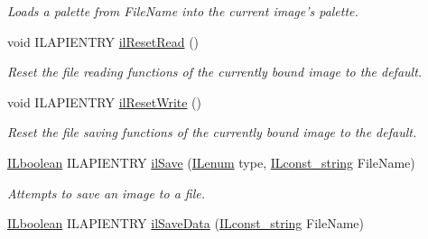 \begin{DoxyCompactItemize}
\begin{DoxyCompactList}\small\item\em Loads a palette from File\+Name into the current image's palette. \end{DoxyCompactList}\item 
\hypertarget{group__file_gaad6da45dcc526f0b4d05c488c504b77b}{void I\+L\+A\+P\+I\+E\+N\+T\+R\+Y \hyperlink{group__file_gaad6da45dcc526f0b4d05c488c504b77b}{il\+Reset\+Read} ()}\label{group__file_gaad6da45dcc526f0b4d05c488c504b77b}

\begin{DoxyCompactList}\small\item\em Reset the file reading functions of the currently bound image to the default. \end{DoxyCompactList}\item 
\hypertarget{group__file_gac1f4f4a66b6ff3ae5a986b24cf2cd626}{void I\+L\+A\+P\+I\+E\+N\+T\+R\+Y \hyperlink{group__file_gac1f4f4a66b6ff3ae5a986b24cf2cd626}{il\+Reset\+Write} ()}\label{group__file_gac1f4f4a66b6ff3ae5a986b24cf2cd626}

\begin{DoxyCompactList}\small\item\em Reset the file saving functions of the currently bound image to the default. \end{DoxyCompactList}\item 
\hyperlink{group__il__types_gaa6aa7c95cfdc06b4d8601ef832b7bb0a}{I\+Lboolean} I\+L\+A\+P\+I\+E\+N\+T\+R\+Y \hyperlink{group__file_ga9defa198f10b426a91f1b764f0dc4a08}{il\+Save} (\hyperlink{group__il__types_ga62ca73445716183ef42b1f3906a45ed0}{I\+Lenum} type, \hyperlink{group__il__types_ga1aa1edc3eb344e14acacb02bade24a5a}{I\+Lconst\+\_\+string} File\+Name)
\begin{DoxyCompactList}\small\item\em Attempts to save an image to a file. \end{DoxyCompactList}\item 
\hypertarget{group__file_gabae3fa5c553904bd5ff5c7e6abc6b2c4}{\hyperlink{group__il__types_gaa6aa7c95cfdc06b4d8601ef832b7bb0a}{I\+Lboolean} I\+L\+A\+P\+I\+E\+N\+T\+R\+Y \hyperlink{group__file_gabae3fa5c553904bd5ff5c7e6abc6b2c4}{il\+Save\+Data} (\hyperlink{group__il__types_ga1aa1edc3eb344e14acacb02bade24a5a}{I\+Lconst\+\_\+string} File\+Name)}\label{group__file_gabae3fa5c553904bd5ff5c7e6abc6b2c4}


\end{DoxyCompactItemize}
